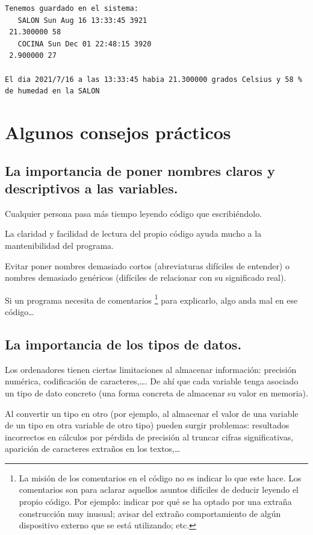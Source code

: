 \documentclass[spanish,12pt,a4paper,final,oneside]{book}
\begin{document}
\begin{lstlisting}[frame=single]
Tenemos guardado en el sistema:
   SALON Sun Aug 16 13:33:45 3921
 21.300000 58
   COCINA Sun Dec 01 22:48:15 3920
 2.900000 27

El dia 2021/7/16 a las 13:33:45 habia 21.300000 grados Celsius y 58 % de humedad en la SALON
\end{lstlisting}


\section{Algunos consejos prácticos}

\subsection{La importancia de poner nombres claros y descriptivos a las variables.}
Cualquier persona pasa más tiempo leyendo código que escribiéndolo.

La claridad y facilidad de lectura del propio código ayuda mucho a la mantenibilidad del programa. 

Evitar poner nombres demasiado cortos (abreviaturas difíciles de entender) o nombres demasiado genéricos (difíciles de relacionar con su significado real).

Si un programa necesita de comentarios \footnote{La misión de los comentarios en el código no es indicar lo que este hace. Los comentarios son para aclarar aquellos asuntos difíciles de deducir leyendo el propio código. Por ejemplo: indicar por qué se ha optado por una extraña construcción muy inusual; avisar del extraño comportamiento de algún dispositivo externo que se está utilizando; etc.} para explicarlo, algo anda mal en ese código\ldots




\subsection{La importancia de los tipos de datos.}
Los ordenadores tienen ciertas limitaciones al almacenar información: precisión numérica, codificación de caracteres,\ldots. De ahí que cada variable tenga asociado un tipo de dato concreto (una forma concreta de almacenar su valor en memoria).

Al convertir un tipo en otro (por ejemplo, al almacenar el valor de una variable de un tipo en otra variable de otro tipo) pueden surgir problemas: resultados incorrectos en cálculos por pérdida de precisión al truncar cifras significativas, aparición de caracteres extraños en los textos,\ldots
\end{document}
